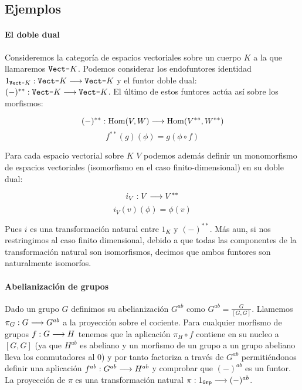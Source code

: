 \subsection{Ejemplos}
\paragraph{El doble dual}
Consideremos la categoría de espacios vectoriales sobre un cuerpo
$K$ a la que llamaremos $\texttt{Vect-}K$. Podemos considerar los endofuntores
identidad $1_{\texttt{Vect-}K} : \texttt{Vect-}K\longrightarrow \texttt{Vect-}K$ y el funtor doble dual:
$(-)^{**} : \texttt{Vect-}K\longrightarrow \texttt{Vect-}K$. El último de estos funtores actúa
así sobre los morfismos:

$$(-)^{**} : \operatorname{Hom}(V, W)\longrightarrow \operatorname{Hom}(V^{**}, W^{**})$$
$$f^{**}(g)(\phi) = g(\phi \circ f)$$

Para cada espacio vectorial sobre $K$ $V$ podemos además
definir un monomorfismo de espacios vectoriales
 (isomorfismo
en el caso finito-dimensional) en su doble dual:

\begin{equation*}
i_V : V\longrightarrow V^{**}
\end{equation*}
\begin{equation*}
i_V(v)(\phi) = \phi(v)
\end{equation*}

Pues $i$ es una transformación natural entre $1_K$ y
$(-)^{**}$. Más aun, si nos restringimos al caso finito dimensional,
debido a que todas las componentes de la transformación natural
son isomorfismos, decimos que ambos funtores son naturalmente isomorfos.

\paragraph{Abelianización de grupos}
Dado un grupo $G$ definimos su abelianización $G^{ab}$ como
$G^{ab} = \frac{G}{[G, G]}$. Llamemos $\pi_G : G\longrightarrow G^{ab}$
a la proyección sobre el cociente. Para cualquier morfismo
de grupos $f : G\longrightarrow H$ tenemos que la aplicación
$\pi_H \circ f$ contiene en su nucleo a $[G, G]$ (ya que
$H^{ab}$ es abeliano y un morfismo de un grupo a un grupo abeliano
lleva los conmutadores al 0) y por tanto factoriza a través
de $G^{ab}$ permitiéndonos definir una aplicación
$f^{ab} : G^{ab}\longrightarrow H^{ab}$ y comprobar
que $(-)^{ab}$ es un funtor. La proyección de $\pi$ es una transformación
natural $\pi : 1_{\texttt{Grp}} \longrightarrow  (-)^{ab}$.
